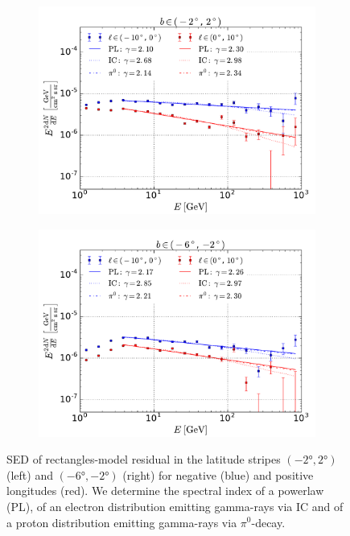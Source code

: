 \begin{figure}[h!]
    \begin{subfigure}{0.5\textwidth}
        \includegraphics[width=\textwidth]{plots/SED_boxes_source_0.pdf}
    \end{subfigure} 
    \begin{subfigure}{0.5\textwidth}
        \includegraphics[width=\textwidth]{plots/SED_boxes_source_-4.pdf}
    \end{subfigure}
  	\caption{SED of rectangles-model residual in the latitude stripes $(\ang{-2}, \ang{2})$ (left) and $(\ang{-6}, \ang{-2})$ (right) for negative (blue) and positive longitudes (red). We determine the spectral index of a powerlaw (PL), of an electron distribution emitting gamma-rays via IC and of a proton distribution emitting gamma-rays via $\pi^0$-decay. }
  	\label{fig:SED_with_fits}
\end{figure}



